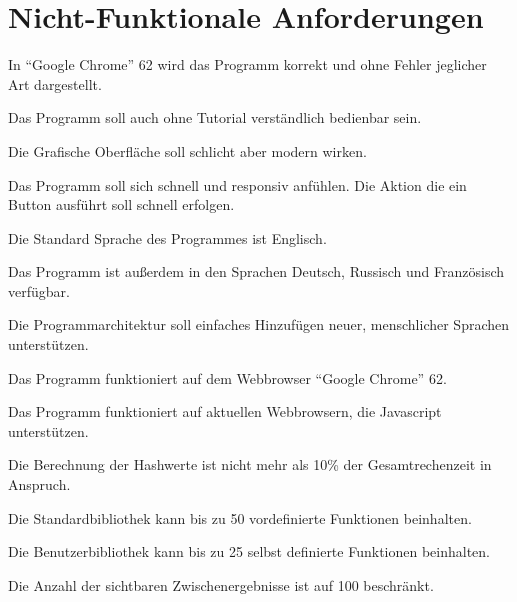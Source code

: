 \documentclass[parskip=full,11pt,twoside]{scrartcl}
\begin{document}
\newpage
\section{Nicht-Funktionale Anforderungen}


In \enquote{Google Chrome} 62 wird das Programm korrekt und ohne Fehler jeglicher Art dargestellt.

Das Programm soll auch ohne Tutorial verständlich bedienbar sein.

Die Grafische Oberfläche soll schlicht aber modern wirken.

Das Programm soll sich schnell und responsiv anfühlen. Die Aktion die ein Button ausführt soll schnell erfolgen.

Die Standard Sprache des Programmes ist Englisch.

Das Programm ist außerdem in den Sprachen Deutsch, Russisch und Französisch verfügbar.

Die Programmarchitektur soll einfaches Hinzufügen neuer, menschlicher Sprachen unterstützen.

Das Programm funktioniert auf dem Webbrowser \enquote{Google Chrome} 62.

Das Programm funktioniert auf aktuellen Webbrowsern, die Javascript unterstützen.

Die Berechnung der Hashwerte ist nicht mehr als 10\% der Gesamtrechenzeit in Anspruch.

Die Standardbibliothek kann bis zu 50 vordefinierte Funktionen beinhalten.

Die Benutzerbibliothek kann bis zu 25 selbst definierte Funktionen beinhalten.

Die Anzahl der sichtbaren Zwischenergebnisse ist auf 100 beschränkt.
\end{document}
